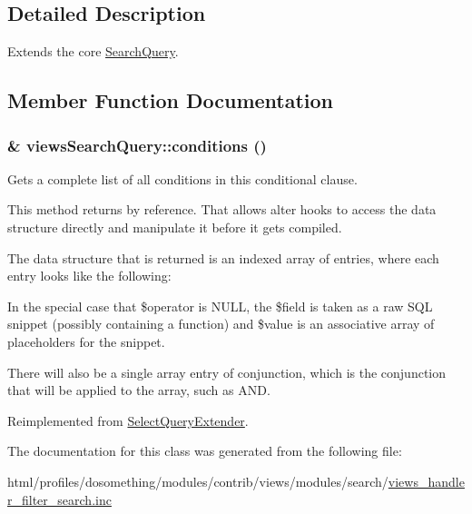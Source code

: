 \subsection{Detailed Description}
Extends the core \hyperlink{classSearchQuery}{SearchQuery}. 

\subsection{Member Function Documentation}
\hypertarget{classviewsSearchQuery_a9e059c456dbd678823b8e937be92301e}{
\subsubsection[{conditions}]{\setlength{\rightskip}{0pt plus 5cm}\& viewsSearchQuery::conditions ()}}
\label{classviewsSearchQuery_a9e059c456dbd678823b8e937be92301e}
Gets a complete list of all conditions in this conditional clause.

This method returns by reference. That allows alter hooks to access the data structure directly and manipulate it before it gets compiled.

The data structure that is returned is an indexed array of entries, where each entry looks like the following: 


In the special case that \$operator is NULL, the \$field is taken as a raw SQL snippet (possibly containing a function) and \$value is an associative array of placeholders for the snippet.

There will also be a single array entry of conjunction, which is the conjunction that will be applied to the array, such as AND. 

Reimplemented from \hyperlink{classSelectQueryExtender_a3d3779c339d6bb794e9c98dc361c07e4}{SelectQueryExtender}.

The documentation for this class was generated from the following file:\begin{DoxyCompactItemize}
\item 
html/profiles/dosomething/modules/contrib/views/modules/search/\hyperlink{views__handler__filter__search_8inc}{views\_\-handler\_\-filter\_\-search.inc}\end{DoxyCompactItemize}
